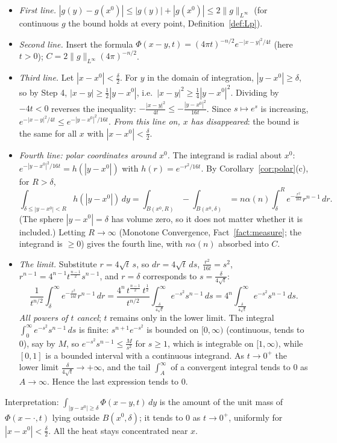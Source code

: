 \documentclass[11pt]{article}
\theoremstyle{plain}
\theoremstyle{definition}
\theoremstyle{remark}
\begin{document}
\begin{itemize}
    \item \emph{First line.} $|g(y) - g(x^0)| \leq |g(y)| + |g(x^0)| \leq 2\|g\|_{L^\infty}$ (for continuous $g$ the bound holds at every point, Definition~\ref{def:Lp}).
    \item \emph{Second line.} Insert the formula $\Phi(x-y,t) = (4\pi t)^{-n/2}e^{-|x-y|^2/4t}$ (here $t > 0$); $C = 2\|g\|_{L^\infty}(4\pi)^{-n/2}$.
    \item \emph{Third line.} Let $|x - x^0| < \frac\delta2$. For $y$ in the domain of integration, $|y - x^0| \geq \delta$, so by Step 4, $|x - y| \geq \frac12|y - x^0|$, i.e.\ $|x - y|^2 \geq \frac14|y - x^0|^2$. Dividing by $-4t < 0$ reverses the inequality: $-\frac{|x-y|^2}{4t} \leq -\frac{|y-x^0|^2}{16t}$. Since $s \mapsto e^s$ is increasing, $e^{-|x-y|^2/4t} \leq e^{-|y-x^0|^2/16t}$. \emph{From this line on, $x$ has disappeared}: the bound is the same for all $x$ with $|x - x^0| < \frac\delta2$.
    \item \emph{Fourth line: polar coordinates around $x^0$.} The integrand is radial about $x^0$: $e^{-|y-x^0|^2/16t} = h(|y - x^0|)$ with $h(r) = e^{-r^2/16t}$. By Corollary~\ref{cor:polar}(c), for $R > \delta$,
    $$ \int_{\delta \le |y - x^0| < R} h(|y - x^0|)\, dy = \int_{B(x^0,R)} - \int_{B(x^0,\delta)} = n\alpha(n)\int_\delta^R e^{-\frac{r^2}{16t}}r^{n-1}\, dr. $$
    (The sphere $|y - x^0| = \delta$ has volume zero, so it does not matter whether it is included.) Letting $R \to \infty$ (Monotone Convergence, Fact~\ref{fact:measure}; the integrand is $\geq 0$) gives the fourth line, with $n\alpha(n)$ absorbed into $C$.
    \item \emph{The limit.} Substitute $r = 4\sqrt t\, s$, so $dr = 4\sqrt t\, ds$, $\frac{r^2}{16t} = s^2$, $r^{n-1} = 4^{n-1}t^{\frac{n-1}{2}}s^{n-1}$, and $r = \delta$ corresponds to $s = \frac{\delta}{4\sqrt t}$:
    $$ \frac{1}{t^{n/2}}\int_\delta^\infty e^{-\frac{r^2}{16t}}r^{n-1}\, dr = \frac{4^n\,t^{\frac{n-1}{2}}\,t^{\frac12}}{t^{n/2}}\int_{\frac{\delta}{4\sqrt t}}^\infty e^{-s^2}s^{n-1}\, ds = 4^n\int_{\frac{\delta}{4\sqrt t}}^\infty e^{-s^2}s^{n-1}\, ds. $$
    \emph{All powers of $t$ cancel}; $t$ remains only in the lower limit. The integral $\int_0^\infty e^{-s^2}s^{n-1}\,ds$ is finite: $s^{n+1}e^{-s^2}$ is bounded on $[0,\infty)$ (continuous, tends to $0$), say by $M$, so $e^{-s^2}s^{n-1} \leq \frac{M}{s^2}$ for $s \geq 1$, which is integrable on $[1,\infty)$, while $[0,1]$ is a bounded interval with a continuous integrand. As $t \to 0^+$ the lower limit $\frac{\delta}{4\sqrt t} \to +\infty$, and the tail $\int_A^\infty$ of a convergent integral tends to $0$ as $A \to \infty$. Hence the last expression tends to $0$.
\end{itemize}
Interpretation: $\int_{|y-x^0|\ge\delta}\Phi(x-y,t)\,dy$ is the amount of the unit mass of $\Phi(x - \cdot,t)$ lying outside $B(x^0,\delta)$; it tends to $0$ as $t \to 0^+$, uniformly for $|x - x^0| < \frac\delta2$. All the heat stays concentrated near $x$.
\end{document}
